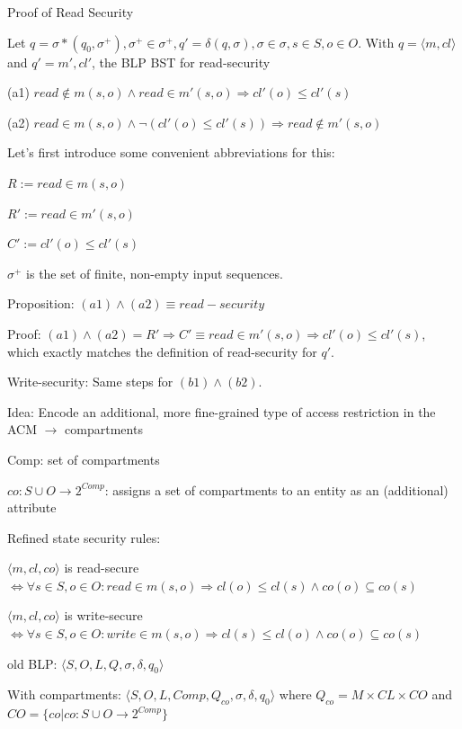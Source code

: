 \documentclass[a4paper]{article}
\begin{document}
\begin{multicols}{3}
    Proof of Read Security
    \begin{itemize*}
        \item Let $q=\sigma*(q_0 ,\sigma^+),\sigma^+\in\sigma^+,q'=\delta(q,\sigma),\sigma\in\sigma,s\in S,o\in O$. With $q=\langle m,cl\rangle$ and $q'=m',cl'$, the BLP BST for read-security
        \begin{itemize*}
            \item (a1) $read \not\in m(s,o) \wedge read\in m'(s,o) \Rightarrow cl'(o) \leq cl'(s)$
            \item (a2) $read \in m(s,o) \wedge\lnot (cl'(o)\leq cl'(s)) \Rightarrow read \not\in m'(s,o)$
            \item Let’s first introduce some convenient abbreviations for this:
            \begin{itemize*}
                \item $R:=read\in m(s,o)$
                \item $R':=read\in m'(s,o)$
                \item $C':=cl'(o) \leq cl'(s)$
                \item $\sigma^+$ is the set of finite, non-empty input sequences.
            \end{itemize*}
            \item Proposition: $(a1) \wedge (a2)\equiv read-security$
            \item Proof: $(a1) \wedge (a2)= R' \Rightarrow C'\equiv read\in m'(s,o) \Rightarrow cl'(o)\leq cl'(s)$, which exactly matches the definition of read-security for $q'$.
            \item Write-security: Same steps for $(b1)\wedge (b2)$.
        \end{itemize*}
    \end{itemize*}

    Idea: Encode an additional, more fine-grained type of access restriction in the ACM $\rightarrow$ compartments
    \begin{itemize*}
        \item Comp: set of compartments
        \item $co:S\cup O\rightarrow 2^{Comp}$: assigns a set of compartments to an entity as an (additional) attribute
        \item Refined state security rules:
        \begin{itemize*}
            \item $\langle m,cl,co\rangle$ is read-secure $\Leftrightarrow\forall s\in S,o\in O:read \in m(s,o)\Rightarrow cl(o)\leq cl(s)\wedge co(o) \subseteq co(s)$
            \item $\langle m,cl,co\rangle$ is write-secure $\Leftrightarrow\forall s\in S,o\in O:write\in m(s,o)\Rightarrow cl(s)\leq cl(o)\wedge co(o) \subseteq co(s)$
        \end{itemize*}
        \item old BLP: $\langle S,O,L,Q,\sigma,\delta,q_0\rangle$
        \item With compartments: $\langle S,O,L,Comp,Q_{co},\sigma,\delta,q_0\rangle$ where $Q_{co}=M\times CL\times CO$ and $CO=\{co|co:S\cup O\rightarrow 2^{Comp}\}$
    \end{itemize*}


\end{multicols}
\end{document}
